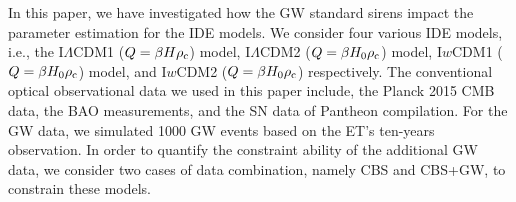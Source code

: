 \documentclass[aps,prd,nofootinbib,amsmath,amssymb,superscriptaddress,twocolumn,10pt]{revtex4}%
\begin{document}
In this paper, we have investigated                                                                                                                                                                                                                                                                                                                                                                                                                                                                                                                                                                                                                                                                                                                                                                                                                                                                                                                                                                                                                                                                                                                                                                                                                                                                                                                                                                                                                                                                                                                                                                                                                                                                                                                                                                                                                                                                                                                                                                                                                                                                                                                                                                                                                                                   how the GW standard sirens impact the parameter estimation for the IDE models. We consider four various IDE models, i.e., the I$\Lambda$CDM1 ($Q=\beta H\rho_{\rm c}$) model, I$\Lambda$CDM2 ($Q=\beta H_{0}\rho_{\rm c}$) model, I$w$CDM1 ($Q=\beta H_{0}\rho_{\rm c}$) model, and I$w$CDM2 ($Q=\beta H_{0}\rho_{\rm c}$) respectively. The conventional optical observational data we used in this paper include, the Planck 2015 CMB data, the BAO measurements, and the SN data of Pantheon compilation. For the GW data, we simulated 1000 GW events based on the ET's ten-years observation. In order to quantify the constraint ability of the additional GW data, we consider two cases of data combination, namely CBS and CBS+GW, to constrain these models.
\end{document}
